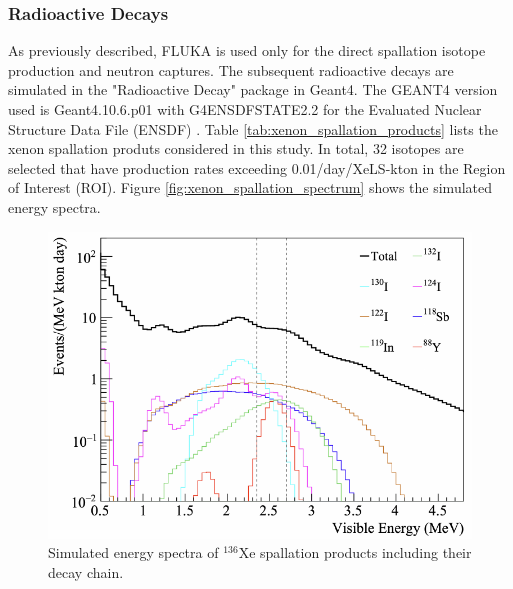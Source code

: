 \subsubsection*{Radioactive Decays}
As previously described, FLUKA is used only for the direct spallation isotope production and neutron captures. The subsequent radioactive decays are simulated in the "Radioactive Decay" package in Geant4. The GEANT4 version used is Geant4.10.6.p01 with G4ENSDFSTATE2.2 for the Evaluated Nuclear Structure Data File (ENSDF) \cite{ENSDF}. Table \ref{tab:xenon_spallation_products} lists the xenon spallation produts considered in this study. In total, 32 isotopes are selected that have production rates exceeding 0.01/day/XeLS-kton in the Region of Interest (ROI). Figure \ref{fig:xenon_spallation_spectrum} shows the simulated energy spectra. 

\begin{figure}[htb]
	\centering
	\includegraphics[scale=0.35]{xenon_spallation_spectra.png}
	\caption{Simulated energy spectra of $^{136}$Xe spallation products including their decay chain.}
	\label{fig:xenon_spallation_spectra}
\end{figure}

